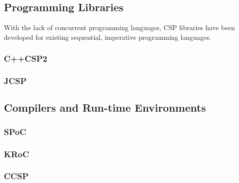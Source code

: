 \subsection{Programming Libraries}
\label{subsec:csp_prog_lib}

With the lack of concurrent programming languages, CSP libraries have been developed for existing sequential, imperative programming languages. 


\subsubsection{C++CSP2}
\label{sssec:c++csp2}




\subsubsection{JCSP}
\label{sssec:jcsp}




\subsection{Compilers and Run-time Environments}
\label{subsec:csp_comp_runtime}




\subsubsection{SPoC}
\label{sssec:spoc}




\subsubsection{KRoC}
\label{sssec:kroc}




\subsubsection{CCSP}
\label{sssec:ccsp}


